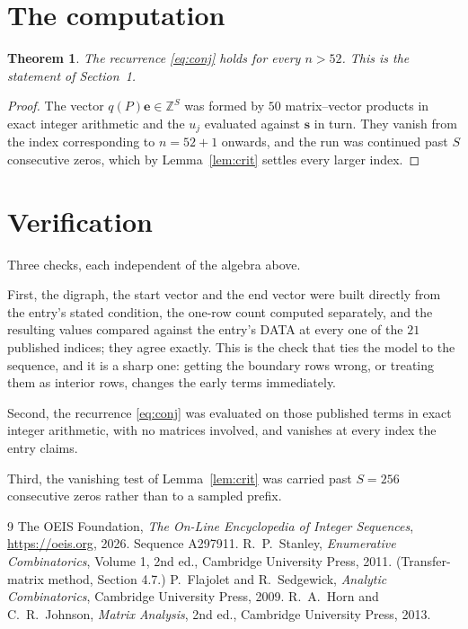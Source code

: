 \documentclass[11pt,a4paper]{article}
\theoremstyle{plain}
\newtheorem{theorem}{Theorem}
\theoremstyle{definition}
\begin{document}
\section{The computation}

\begin{theorem}
The recurrence \eqref{eq:conj} holds for every $n>52$. This is the statement of
Section~1.
\end{theorem}

\begin{proof}
The vector $q(P)\mathbf{e}\in\mathbb{Z}^{S}$ was formed by $50$ matrix--vector
products in exact integer arithmetic and the $u_j$ evaluated against $\mathbf{s}$ in turn.
They vanish from the index corresponding to $n=52+1$ onwards, and the run was continued
past $S$ consecutive zeros, which by Lemma~\ref{lem:crit} settles every larger index.
\end{proof}

\section{Verification}

Three checks, each independent of the algebra above.

First, the digraph, the start vector and the end vector were built directly from the
entry's stated condition, the one-row count computed separately, and the resulting values
compared against the entry's DATA at every one of the $21$ published indices; they
agree exactly. This is the check that ties the model to the sequence, and it is a sharp one:
getting the boundary rows wrong, or treating them as interior rows, changes the early terms
immediately.

Second, the recurrence \eqref{eq:conj} was evaluated on those published terms in exact
integer arithmetic, with no matrices involved, and vanishes at every index the entry claims.

Third, the vanishing test of Lemma~\ref{lem:crit} was carried past $S=256$ consecutive
zeros rather than to a sampled prefix.

\begin{thebibliography}{9}
 The OEIS Foundation, \emph{The On-Line Encyclopedia of Integer
Sequences}, \url{https://oeis.org}, 2026. Sequence A297911.
 R.~P.~Stanley, \emph{Enumerative Combinatorics}, Volume 1, 2nd ed.,
Cambridge University Press, 2011. (Transfer-matrix method, Section 4.7.)
 P.~Flajolet and R.~Sedgewick, \emph{Analytic Combinatorics}, Cambridge
University Press, 2009.
 R.~A.~Horn and C.~R.~Johnson, \emph{Matrix Analysis}, 2nd ed., Cambridge
University Press, 2013.
\end{thebibliography}
\end{document}
